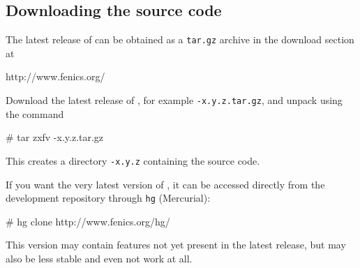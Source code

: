 
\subsection{Downloading the source code}

The latest release of \package{} can be obtained as a \texttt{tar.gz}
archive in the download section at
\begin{code}
 http://www.fenics.org/
\end{code}

Download the latest release of \package{}, for example \texttt{\packagett{}-x.y.z.tar.gz},
and unpack using the command
\begin{macrocode}
# tar zxfv \packagett{}-x.y.z.tar.gz
\end{macrocode}

This creates a directory \texttt{\packagett{}-x.y.z} containing the
\package{} source code.

If you want the very latest version of \package{}, it can be accessed
directly from the development repository through \texttt{hg}
(Mercurial):
\begin{macrocode}
# hg clone http://www.fenics.org/hg/\packagett{}
\end{macrocode}
This version may contain features not yet present in the latest
release, but may also be less stable and even not work at all.
